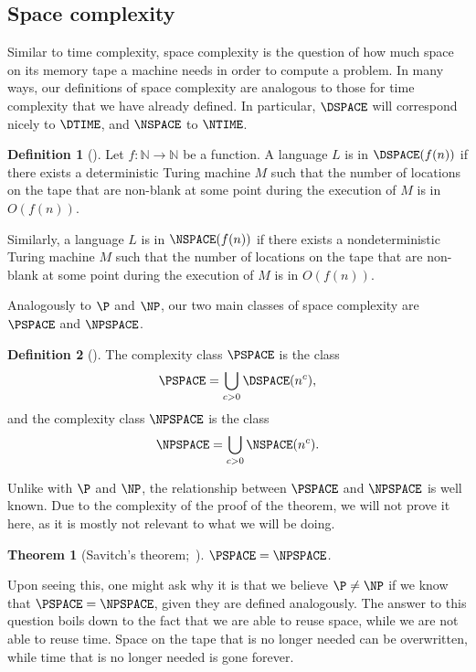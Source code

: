 \documentclass[english,12pt]{reedthesis}
\theoremstyle{plain}
\newtheorem{thm}{Theorem}[section]
\theoremstyle{definition}
\newtheorem{defn}[defn]{Definition}
\theoremstyle{remark}
\begin{document}
\subsection{Space complexity}

Similar to time complexity, space complexity is the question of how much space
on its memory tape a machine needs in order to compute a problem. In many ways,
our definitions of space complexity are analogous to those for time complexity
that we have already defined. In particular, $\DSPACE$ will correspond nicely to
$\DTIME$, and $\NSPACE$ to $\NTIME$.

\begin{defn}[{\cite[Def.\ 4.1]{AB09}}]%
  \label{def:dspace-nspace}
  Let $f\colon \mathbb{N} \rightarrow \mathbb{N}$ be a function. A language $L$ is in $\DSPACE(f(n))$ if
  there exists a deterministic Turing machine $M$ such that the number of
  locations on the tape that are non-blank at some point during the execution of
  $M$ is in $O(f(n))$.

  Similarly, a language $L$ is in $\NSPACE(f(n))$ if there exists a
  nondeterministic Turing machine $M$ such that the number of locations on the
  tape that are non-blank at some point during the execution of $M$ is in
  $O(f(n))$.
\end{defn}

Analogously to $\P$ and $\NP$, our two main classes of space complexity are
$\PSPACE$ and $\NPSPACE$.

\begin{defn}[{\cite[Def.\ 4.5]{AB09}}]%
  \label{def:pspace-npspace}
  The complexity class $\PSPACE$ is the class
  \[
    \PSPACE = \bigcup_{c > 0}\DSPACE(n^{c}),
  \]
  and the complexity class $\NPSPACE$ is the class
  \[
    \NPSPACE = \bigcup_{c > 0}\NSPACE(n^{c}).
  \]
\end{defn}

Unlike with $\P$ and $\NP$, the relationship between $\PSPACE$ and $\NPSPACE$ is
well known. Due to the complexity of the proof of the theorem, we will not prove
it here, as it is mostly not relevant to what we will be doing.

\begin{thm}[{Savitch's theorem;~\cite{Sav70}}]\label{thm:savitch}
  $\PSPACE = \NPSPACE$.
\end{thm}

Upon seeing this, one might ask why it is that we believe $\P \ne \NP$ if we know
that $\PSPACE = \NPSPACE$, given they are defined analogously. The answer to
this question boils down to the fact that we are able to reuse space, while we
are not able to reuse time. Space on the tape that is no longer needed can be
overwritten, while time that is no longer needed is gone forever.
\end{document}
